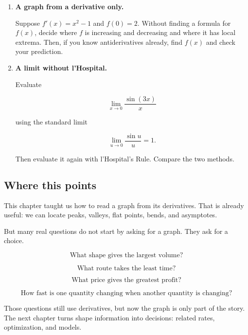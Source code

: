 \begin{enumerate}
Find a function \(f\) such that

\[
f'(0)=0,
\]

but \(0\) is not a local maximum or local minimum.  Explain why your example has a
horizontal tangent without a turning point.

\item \textbf{A graph from a derivative only.}

Suppose \(f'(x)=x^2-1\) and \(f(0)=2\).  Without finding a formula for \(f(x)\), decide
where \(f\) is increasing and decreasing and where it has local extrema.  Then, if you
know antiderivatives already, find \(f(x)\) and check your prediction.

\item \textbf{A limit without l'Hospital.}

Evaluate

\[
\lim_{x\to0}\frac{\sin(3x)}{x}
\]

using the standard limit

\[
\lim_{u\to0}\frac{\sin u}{u}=1.
\]

Then evaluate it again with l'Hospital's Rule.  Compare the two methods.
\end{enumerate}

\subsection{Where this points}
\label{subsec:chapter-6-hook-optimization}

This chapter taught us how to read a graph from its derivatives.  That is already useful:
we can locate peaks, valleys, flat points, bends, and asymptotes.

But many real questions do not start by asking for a graph.  They ask for a choice.

\[
\text{What shape gives the largest volume?}
\]

\[
\text{What route takes the least time?}
\]

\[
\text{What price gives the greatest profit?}
\]

\[
\text{How fast is one quantity changing when another quantity is changing?}
\]

Those questions still use derivatives, but now the graph is only part of the story.  The
next chapter turns shape information into decisions: related rates, optimization, and
models.
\label{sec:ch6-discovery}

